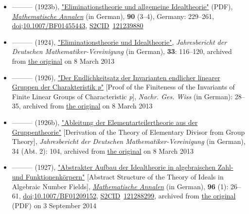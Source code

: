 \begin{itemize}
\item
  {---}{---}{---} (1923b), \href{http://www.digizeitschriften.de/download/PPN235181684_0090/log25.pdf}{"Eliminationstheorie und allgemeine Idealtheorie"} {(PDF)}, \emph{\href{https://en.wikipedia.org/wiki/Mathematische_Annalen}{Mathematische Annalen}} (in German), \textbf{90} ({3--}4), Germany: {229--}261, \href{https://en.wikipedia.org/wiki/Doi_(identifier)}{doi}:\href{https://doi.org/10.1007\%2FBF01455443}{10.1007/BF01455443}, \href{https://en.wikipedia.org/wiki/S2CID_(identifier)}{S2CID}{~}\href{https://api.semanticscholar.org/CorpusID:121239880}{121239880}{}
\item
  {---}{---}{---} (1924), \href{https://web.archive.org/web/20130308102926/http://gdz.sub.uni-goettingen.de/no_cache/dms/load/img/?IDDOC=248880}{"Eliminationstheorie und Idealtheorie"}, \emph{Jahresbericht der Deutschen Mathematiker-Vereinigung} (in German), \textbf{33}: {116--}120, archived from \href{http://gdz.sub.uni-goettingen.de/no_cache/dms/load/img/?IDDOC=248880}{the original} on 8 March 2013{}
\item
  {---}{---}{---} (1926), \href{https://web.archive.org/web/20130308102929/http://gdz.sub.uni-goettingen.de/no_cache/dms/load/img/?IDDOC=63971}{"Der Endlichkeitsatz der Invarianten endlicher linearer Gruppen der Charakteristik \emph{p}"} {{[}}Proof of the Finiteness of the Invariants of Finite Linear Groups of Characteristic \emph{p}{{]}}, \emph{Nachr. Ges. Wiss} (in German): {28--}35, archived from \href{http://gdz.sub.uni-goettingen.de/no_cache/dms/load/img/?IDDOC=63971}{the original} on 8 March 2013{}
\item
  {---}{---}{---} (1926b), \href{https://web.archive.org/web/20130308102932/http://gdz.sub.uni-goettingen.de/no_cache/dms/load/img/?IDDOC=248861}{"Ableitung der Elementarteilertheorie aus der Gruppentheorie"} {{[}}Derivation of the Theory of Elementary Divisor from Group Theory{{]}}, \emph{Jahresbericht der Deutschen Mathematiker-Vereinigung} (in German), 34 (Abt. 2): 104, archived from \href{http://gdz.sub.uni-goettingen.de/no_cache/dms/load/img/?IDDOC=248861}{the original} on 8 March 2013{}
\item
  {---}{---}{---} (1927), \href{https://web.archive.org/web/20140903095147/http://gdz.sub.uni-goettingen.de/index.php?id=11&PPN=GDZPPN002270951&L=1}{"Abstrakter Aufbau der Idealtheorie in algebraischen Zahl- und Funktionenkörpern"} {{[}}Abstract Structure of the Theory of Ideals in Algebraic Number Fields{{]}}, \emph{\href{https://en.wikipedia.org/wiki/Mathematische_Annalen}{Mathematische Annalen}} (in German), \textbf{96} (1): {26--}61, \href{https://en.wikipedia.org/wiki/Doi_(identifier)}{doi}:\href{https://doi.org/10.1007\%2FBF01209152}{10.1007/BF01209152}, \href{https://en.wikipedia.org/wiki/S2CID_(identifier)}{S2CID}{~}\href{https://api.semanticscholar.org/CorpusID:121288299}{121288299}, archived from \href{http://gdz.sub.uni-goettingen.de/index.php?id=11&PPN=GDZPPN002270951&L=1}{the original} {(PDF)} on 3 September 2014{}

\end{itemize}
